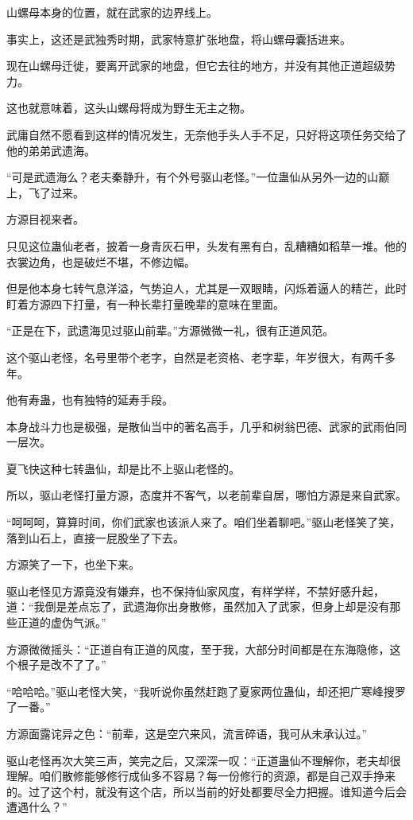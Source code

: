 \begin{this_body}
山螺母本身的位置，就在武家的边界线上。

事实上，这还是武独秀时期，武家特意扩张地盘，将山螺母囊括进来。

现在山螺母迁徙，要离开武家的地盘，但它去往的地方，并没有其他正道超级势力。

这也就意味着，这头山螺母将成为野生无主之物。

武庸自然不愿看到这样的情况发生，无奈他手头人手不足，只好将这项任务交给了他的弟弟武遗海。

“可是武遗海么？老夫秦静升，有个外号驱山老怪。”一位蛊仙从另外一边的山巅上，飞了过来。

方源目视来者。

只见这位蛊仙老者，披着一身青灰石甲，头发有黑有白，乱糟糟如稻草一堆。他的衣裳边角，也是破烂不堪，不修边幅。

但是他本身七转气息洋溢，气势迫人，尤其是一双眼睛，闪烁着逼人的精芒，此时盯着方源四下打量，有一种长辈打量晚辈的意味在里面。

“正是在下，武遗海见过驱山前辈。”方源微微一礼，很有正道风范。

这个驱山老怪，名号里带个老字，自然是老资格、老字辈，年岁很大，有两千多年。

他有寿蛊，也有独特的延寿手段。

本身战斗力也是极强，是散仙当中的著名高手，几乎和树翁巴德、武家的武雨伯同一层次。

夏飞快这种七转蛊仙，却是比不上驱山老怪的。

所以，驱山老怪打量方源，态度并不客气，以老前辈自居，哪怕方源是来自武家。

“呵呵呵，算算时间，你们武家也该派人来了。咱们坐着聊吧。”驱山老怪笑了笑，落到山石上，直接一屁股坐了下去。

方源笑了一下，也坐下来。

驱山老怪见方源竟没有嫌弃，也不保持仙家风度，有样学样，不禁好感升起，道：“我倒是差点忘了，武遗海你出身散修，虽然加入了武家，但身上却是没有那些正道的虚伪气派。”

方源微微摇头：“正道自有正道的风度，至于我，大部分时间都是在东海隐修，这个根子是改不了了。”

“哈哈哈。”驱山老怪大笑，“我听说你虽然赶跑了夏家两位蛊仙，却还把广寒峰搜罗了一番。”

方源面露诧异之色：“前辈，这是空穴来风，流言碎语，我可从未承认过。”

驱山老怪再次大笑三声，笑完之后，又深深一叹：“正道蛊仙不理解你，老夫却很理解。咱们散修能够修行成仙多不容易？每一份修行的资源，都是自己双手挣来的。过了这个村，就没有这个店，所以当前的好处都要尽全力把握。谁知道今后会遭遇什么？”


\end{this_body}
